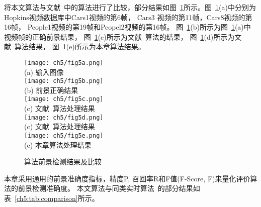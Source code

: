 将本文算法与文献~中的算法进行了比较，部分结果如图~\ref{ch5:fig:comparison}所示。图~\ref{ch5:fig:comparison}(a)中分别为Hopkins视频数据库中Cars1视频的第6帧， Cars3 视频的第11帧，Cars8视频的第16帧， People1视频的第19帧和Peopel2视频的第16帧。 图~\ref{ch5:fig:comparison}(b)所示为图~\ref{ch5:fig:comparison}(a)中视频帧的正确前景结果， 图~\ref{ch5:fig:comparison}(c)所示为文献~算法的结果， 图~\ref{ch5:fig:comparison}(d)所示为文献~算法结果，  图~\ref{ch5:fig:comparison}(e)所示为本章算法结果。
\begin{figure}[ht]
  \centering
  \texttt{[image: ch5/fig5a.png]}\\
  (a) 输入图像\\
   \texttt{[image: ch5/fig5b.png]}\\
   (b) 前景正确结果\\
   \texttt{[image: ch5/fig5c.png]}\\
   (c) 文献~算法处理结果\\
   \texttt{[image: ch5/fig5d.png]}\\
   (c) 文献~算法处理结果\\
   \texttt{[image: ch5/fig5e.png]}\\
   (c) 本章算法处理结果\\
  \caption{算法前景检测结果及比较}\label{ch5:fig:comparison}
\end{figure}


 本章采用通用的前景准确度指标，精度P, 召回率R和F值(F-Score, F)来量化评价算法的前景检测准确度。 本文算法与同类实时算法~\cite{5.8s}的部分结果如表~\ref{ch5:tab:comparison}所示。


